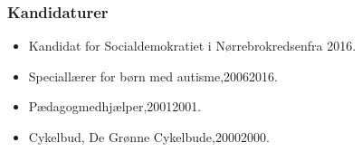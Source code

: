 \documentclass[11pt, a4paper]{awesome-cv}
\begin{document}
\begin{cvletter}
\subsubsection*{Kandidaturer}
\begin{itemize}
\item Kandidat for Socialdemokratiet i Nørrebrokredsenfra 2016.
\end{itemize}
\begin{itemize}
\item Speciallærer for børn med autisme,20062016.
\item Pædagogmedhjælper,20012001.
\item Cykelbud, De Grønne Cykelbude,20002000.
\end{itemize}
\end{cvletter}
\end{document}
